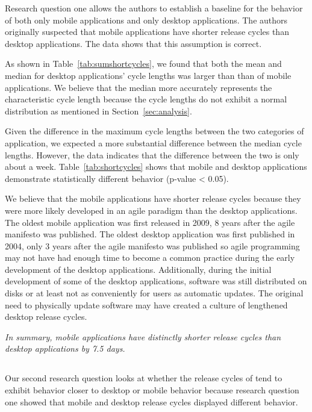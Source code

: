 \documentclass{acm_proc_article-sp}
\begin{document}




Research question one allows the authors to establish a baseline for the behavior of both only mobile applications and only desktop applications.
The authors originally suspected that mobile applications have shorter release cycles than desktop applications.
The data shows that this assumption is correct. 

As shown in Table~\ref{tab:sumshortcycles}, we found that both the mean and median for desktop applications' cycle lengths was larger than than of mobile applications. 
We believe that the median more accurately represents the characteristic cycle length because the cycle lengths do not exhibit a normal distribution as mentioned in Section~\ref{sec:analysis}. 

Given the difference in the maximum cycle lengths between the two categories of application, we expected a more substantial difference between the median cycle lengths.
However, the data indicates that the difference between the two is only about a week.
Table~\ref{tab:shortcycles} shows that mobile and desktop applications demonstrate statistically different behavior (p-value < 0.05).

We believe that the mobile applications have shorter release cycles because they were more likely developed in an agile paradigm than the desktop applications. 
The oldest mobile application was first released in 2009, 8 years after the agile manifesto was published. 
The oldest desktop application was first published in 2004, only 3 years after the agile manifesto was published so agile programming may not have had enough time to become a common practice during the early development of the desktop applications.
Additionally, during the initial development of some of the desktop applications, software was still distributed on disks or at least not as conveniently for users as automatic updates. 
The original need to physically update software may have created a culture of lengthened desktop release cycles.



\textit{In summary, mobile applications have distinctly shorter release cycles than desktop applications by 7.5 days.}


\subsection{\RQTwo }
Our second research question looks at whether the release cycles of \sibs tend to exhibit behavior closer to desktop or mobile behavior because research question one showed that mobile and desktop release cycles displayed different behavior.
\end{document}
